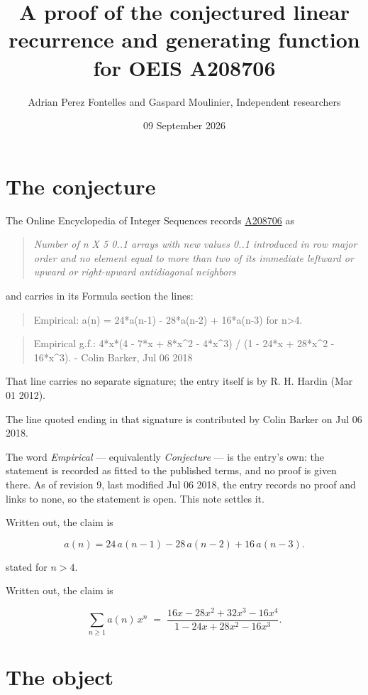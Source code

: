 \documentclass[11pt]{article}
\title{A proof of the conjectured linear recurrence and generating function for OEIS A208706}
\author{Adrian Perez Fontelles and Gaspard Moulinier, Independent researchers}
\date{09 September 2026}
\theoremstyle{definition}
\begin{document}
\maketitle
\section{The conjecture}

The Online Encyclopedia of Integer Sequences records \href{https://oeis.org/A208706}{A208706} as

\begin{quote}\itshape Number of n X 5 0..1 arrays with new values 0..1 introduced in row major order and no element equal to more than two of its immediate leftward or upward or right-upward antidiagonal neighbors\end{quote}

and carries in its Formula section the lines:

\begin{quote}\ttfamily Empirical: a(n) = 24*a(n-1) - 28*a(n-2) + 16*a(n-3) for n>4.\end{quote}

\begin{quote}\ttfamily Empirical g.f.: 4*x*(4 - 7*x + 8*x\textasciicircum{}2 - 4*x\textasciicircum{}3) / (1 - 24*x + 28*x\textasciicircum{}2 - 16*x\textasciicircum{}3). - Colin Barker, Jul 06 2018\end{quote}

That line carries no separate signature; the entry itself is by R. H. Hardin (Mar 01 2012).

The line quoted ending in that signature is contributed by Colin Barker on Jul 06 2018.

The word {\itshape Empirical} --- equivalently {\itshape Conjecture} --- is the entry's own: the statement is recorded as fitted to the published terms, and no proof is given there. As of revision 9, last modified Jul 06 2018, the entry records no proof and links to none, so the statement is open. This note settles it.

Written out, the claim is

\[a(n) = 24\,a(n-1) - 28\,a(n-2) + 16\,a(n-3).\]

stated for $n > 4$.

Written out, the claim is

\[\sum_{n \ge 1} a(n)\,x^n \;=\; \frac{16x - 28x^{2} + 32x^{3} - 16x^{4}}{1 - 24x + 28x^{2} - 16x^{3}}.\]

\section{The object}
\end{document}
